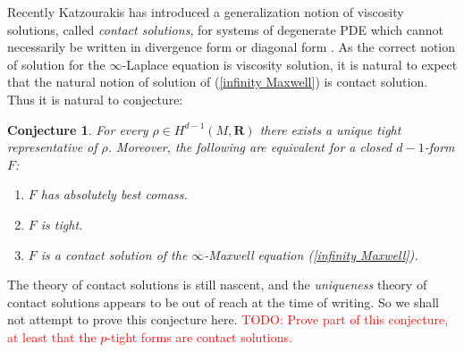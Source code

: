 \documentclass[reqno,11pt]{amsart}
\newcommand{\RR}{\mathbf{R}}
\newcommand*\dif{\mathop{}\!\mathrm{d}}
\newcommand{\dfn}[1]{\emph{#1}\index{#1}}
\newtheorem{proposition}[theorem]{Proposition}
\newtheorem{conjecture}[theorem]{Conjecture}
\theoremstyle{definition}
\numberwithin{equation}{section}
\newcommand\todo[1]{\textcolor{red}{TODO: #1}}
\begin{document}
Recently Katzourakis has introduced a generalization notion of viscosity solutions, called \dfn{contact solutions}, for systems of degenerate PDE which cannot necessarily be written in divergence form or diagonal form \cite{Katzourakis2018OnAV}.
As the correct notion of solution for the $\infty$-Laplace equation is viscosity solution, it is natural to expect that the natural notion of solution of (\ref{infinity Maxwell}) is contact solution.
Thus it is natural to conjecture:

\begin{conjecture}
For every $\rho \in H^{d - 1}(M, \RR)$ there exists a unique tight representative of $\rho$.
Moreover, the following are equivalent for a closed $d-1$-form $F$:
\begin{enumerate}
\item $F$ has absolutely best comass.
\item $F$ is tight.
\item $F$ is a contact solution of the $\infty$-Maxwell equation (\ref{infinity Maxwell}).
\end{enumerate}
\end{conjecture}

The theory of contact solutions is still nascent, and the \emph{uniqueness} theory of contact solutions appears to be out of reach at the time of writing.
So we shall not attempt to prove this conjecture here.
\todo{Prove part of this conjecture, at least that the $p$-tight forms are contact solutions.}



\end{document}

